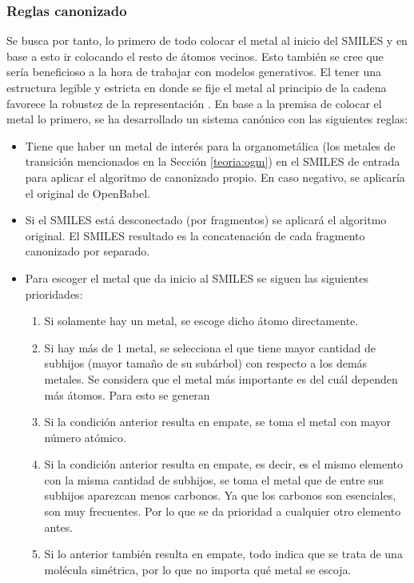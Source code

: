\subsubsection{Reglas canonizado} \label{reglas_canonizado}

Se busca por tanto, lo primero de todo colocar el metal al inicio del SMILES y en base a esto ir colocando el resto de átomos vecinos. Esto también se cree que sería beneficioso a la hora de trabajar con modelos generativos. El tener una estructura legible y estricta en donde se fije el metal al principio de la cadena favorece la robustez de la representación \cite{SELFIES, krenn_self_referencing_2020}.
En base a la premisa de colocar el metal lo primero, se ha desarrollado un sistema canónico con las siguientes reglas:
\begin{itemize}
    \item Tiene que haber un metal de interés para la organometálica (los metales de transición mencionados en la Sección \ref{teoria:ogm}) en el SMILES de entrada para aplicar el algoritmo de canonizado propio. En caso negativo, se aplicaría el original de OpenBabel. 
    \item Si el SMILES está desconectado (por fragmentos) se aplicará el algoritmo original. El SMILES resultado es la concatenación de cada fragmento canonizado por separado.
    \item Para escoger el metal que da inicio al SMILES se siguen las siguientes prioridades:
        \begin{enumerate}
            \item Si solamente hay un metal, se escoge dicho átomo directamente.
            \item Si hay más de 1 metal, se selecciona el que tiene mayor cantidad de subhijos (mayor tamaño de su subárbol) con respecto a los demás metales. Se considera que el metal más importante es del cuál dependen más átomos. Para esto se generan 
            \item Si la condición anterior resulta en empate, se toma el metal con mayor número atómico.
            \item Si la condición anterior resulta en empate, es decir, es el mismo elemento con la misma cantidad de subhijos, se toma el metal que de entre sus subhijos aparezcan menos carbonos. Ya que los carbonos son esenciales, son muy frecuentes. Por lo que se da prioridad a cualquier otro elemento antes.
            \item Si lo anterior también resulta en empate, todo indica que se trata de una molécula simétrica, por lo que no importa qué metal se escoja.
        \end{enumerate}
\end{itemize}


